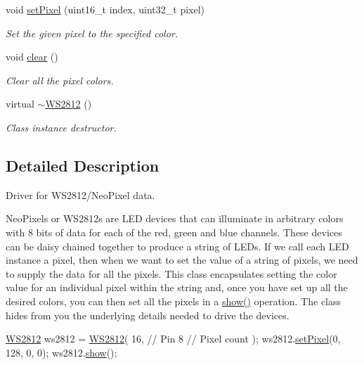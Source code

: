 \begin{DoxyCompactItemize}
void \hyperlink{class_w_s2812_a65924d977bab621786b01a09c91456f6}{set\+Pixel} (uint16\+\_\+t index, uint32\+\_\+t pixel)
\begin{DoxyCompactList}\small\item\em Set the given pixel to the specified color. \end{DoxyCompactList}\item 
void \hyperlink{class_w_s2812_aceeaba644d2cc545b84d2807732b6461}{clear} ()
\begin{DoxyCompactList}\small\item\em Clear all the pixel colors. \end{DoxyCompactList}\item 
virtual \hyperlink{class_w_s2812_a58973dedd9cbc5c3fd3397f07f9a720f}{$\sim$\+W\+S2812} ()\hypertarget{class_w_s2812_a58973dedd9cbc5c3fd3397f07f9a720f}{}\label{class_w_s2812_a58973dedd9cbc5c3fd3397f07f9a720f}

\begin{DoxyCompactList}\small\item\em Class instance destructor. \end{DoxyCompactList}\end{DoxyCompactItemize}


\subsection{Detailed Description}
Driver for W\+S2812/\+Neo\+Pixel data. 

Neo\+Pixels or W\+S2812s are L\+ED devices that can illuminate in arbitrary colors with 8 bits of data for each of the red, green and blue channels. These devices can be daisy chained together to produce a string of L\+E\+Ds. If we call each L\+ED instance a pixel, then when we want to set the value of a string of pixels, we need to supply the data for all the pixels. This class encapsulates setting the color value for an individual pixel within the string and, once you have set up all the desired colors, you can then set all the pixels in a \hyperlink{class_w_s2812_ad03797836617dccf530cb7c6423c03fe}{show()} operation. The class hides from you the underlying details needed to drive the devices.


\begin{DoxyCode}
\hyperlink{class_w_s2812}{WS2812} ws2812 = \hyperlink{class_w_s2812_a873e567f57a612a0e408b5bb310d9024}{WS2812}(
  16, \textcolor{comment}{// Pin}
  8   \textcolor{comment}{// Pixel count}
);
ws2812.\hyperlink{class_w_s2812_a60025d23e7fc21c3ce8c1f02bd50bf86}{setPixel}(0, 128, 0, 0);
ws2812.\hyperlink{class_w_s2812_ad03797836617dccf530cb7c6423c03fe}{show}();
\end{DoxyCode}
 

